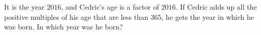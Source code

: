 It is the year $2016$, and Cedric's age is a factor of $2016$. If Cedric adds up all the positive multiples of his age that are less than $365$, he gets the year in which he was born. In which year was he born?
